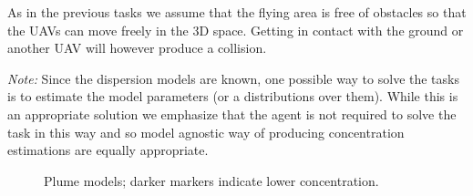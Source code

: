 \documentclass[a4paper,11pt]{report}
\begin{document}
As in the previous tasks we assume that the flying area is free of obstacles so that the UAVs can move freely in the 3D space. Getting in contact with the ground or another UAV will however produce a collision.

\textit{Note:}
Since the dispersion models are known, one possible way to solve the tasks is to estimate the model parameters (or a distributions over them). While this is an appropriate solution we emphasize that the agent is not required to solve the task in this way and so model agnostic way of producing concentration estimations are equally appropriate. 

\begin{figure}[t]
\centering
{}
\caption{Plume models; darker markers indicate lower concentration.\label{fig:plume}}
\end{figure}
\end{document}

